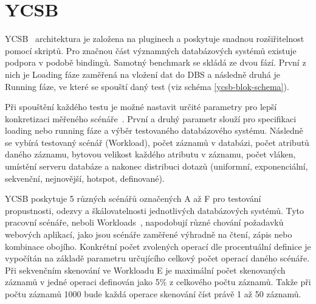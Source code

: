 \documentclass[czech,master,dept460,male,csharp,cpdeclaration]{diploma}
\begin{document}
	\section{YCSB} \label{lab-ycsb}
	
	YCSB~\cite{ycsb,ycsb-benchmarking} architektura je založena na pluginech a poskytuje snadnou rozšiřitelnost pomocí skriptů. Pro značnou část významných databázových systémů existuje podpora v podobě bindingů. Samotný benchmark se skládá ze dvou fází. První z nich je Loading fáze zaměřená na vložení dat do DBS a následně druhá je Running fáze, ve které se spouští daný test (viz schéma \ref{ycsb-blok-schema}).
	
	Při spouštění každého testu je možné nastavit určité parametry pro lepší konkretizaci měřeného scénáře~\cite{ytb-ycsb}. První a druhý parametr slouží pro specifikaci loading nebo running fáze a výběr testovaného databázového systému. Následně se vybírá testovaný scénář (Workload), počet záznamů v databázi, počet atributů daného záznamu, bytovou velikost každého atributu v záznamu, počet vláken, umístění serveru databáze a nakonec distribuci dotazů (uniformní, exponenciální, sekvenční, nejnovější, hotspot, definované).
	
	YCSB poskytuje 5 různých scénářů označených A až F pro testování propustnosti, odezvy a škálovatelnosti jednotlivých databázových systémů. Tyto pracovní scénáře, neboli Workloads~\cite{benchmark-pdf-1, workloads}, napodobují různé chování požadavků webových aplikací, jako jsou scénáře zaměřené výhradně na čtení, zápis nebo kombinace obojího. Konkrétní počet zvolených operací dle procentuální definice je vypočítán na základě parametru určujícího celkový počet operací daného scénáře. Při sekvenčním skenování ve Workloadu E je maximální počet skenovaných záznamů v jedné operaci definován jako 5\% z celkového počtu záznamů. Takže při počtu záznamů 1000 bude každá operace skenování číst právě 1 až 50 záznamů.
	
\end{document}
